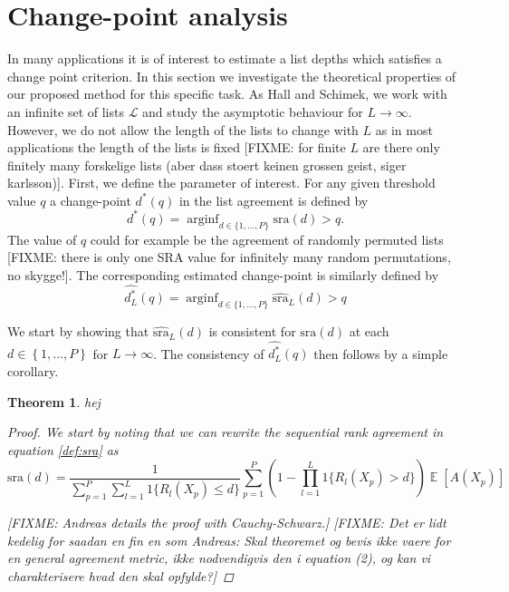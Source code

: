 \documentclass[12pt,a4paper]{article}
\DeclareMathOperator{\E}{\mathbb{E}}
\DeclareMathOperator{\arginf}{arginf}
\theoremstyle{plain}
\newtheorem{theorem}{Theorem}
\begin{document}
\section{Change-point analysis}
In many applications it is of interest to estimate a list depths which
satisfies a change point criterion. In this section we investigate the
theoretical properties of our proposed method for this specific
task. As Hall and Schimek, we work with an infinite set of lists
$\mathcal{L}$ and study the asymptotic behaviour for
$L\to\infty$. However, we do not allow the length of the lists to
change with $L$ as in most applications the length of the lists is
fixed [FIXME: for finite $L$ are there only finitely many forskelige
lists (aber dass stoert keinen grossen geist, siger karlsson)]. First,
we define the parameter of interest. For any given threshold value $q$
a change-point $d^\ast(q)$ in the list agreement is defined by
\begin{equation}
  d^\ast(q) = \arginf_{d\in\{1,\dots,P\}}\textrm{sra}(d)>q.
\end{equation}
The value of $q$ could for example be the agreement of randomly
permuted lists [FIXME: there is only one SRA value for infinitely many
random permutations, no skygge!].
The corresponding estimated change-point is similarly defined by
\begin{equation}
\widehat{d^\ast_L}(q) = \arginf_{d\in\{1,\dots,P\}}\widehat{\textrm{sra}}_L(d)>q
\end{equation}


We start by showing that $\widehat{\textrm{sra}}_L(d)$ is consistent for $\textrm{sra}(d)$ at each
$d \in \left\{1,\ldots,P\right\}$ for $L \rightarrow \infty$. The consistency of $\widehat{d^\ast_L}(q)$
then follows by a simple corollary.


\begin{theorem}
hej
\begin{proof}
We start by noting that we can rewrite the sequential rank agreement in equation \ref{def:sra} as
\begin{equation}
\textrm{sra}(d)= \frac 1{\sum_{p=1}^P \sum_{l=1}^L 1\{R_l(X_p)\le d\}}\sum_{p=1}^P(1-\prod_{l=1}^L 1\{R_l(X_p)>d\}) \E[A(X_p)]
\end{equation}

[FIXME: Andreas details the proof with Cauchy-Schwarz.]
[FIXME: Det er lidt kedelig for saadan en fin en som Andreas: Skal theoremet og bevis ikke vaere for en general agreement metric, ikke nodvendigvis den i equation (2), og kan vi charakterisere hvad den skal opfylde?]
\end{proof}
\label{thm:consistency}
\end{theorem}
\end{document}
